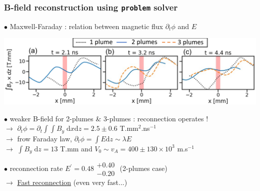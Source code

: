 \documentclass{beamer}
\newcommand{\D}{{\mathrm d}}
\begin{document}
\begin{frame}
\frametitle{B-field reconstruction using \texttt{problem} solver}

$\bullet$ Maxwell-Faraday : relation between magnetic flux $\partial_t \phi$ and $E$ \\

\begin{center}
\includegraphics[width=1.0\textwidth]{problem.png}
\end{center}

$\bullet$ weaker B-field for 2-plumes \& 3-plumes : reconnection operates ! \\
$\to$ $\partial_t \phi = \partial_t \int \!\!\! \int B_y \; \D x \D z = 2.5 \pm 0.6$ T.mm$^2$.ns$^{-1}$ \\
$\to$ frow Faraday law, $\partial_t \phi = \int E \D z \sim \lambda E$ \\
$\to$ $\int B_y \; \D z = 13$ T.mm and $V_0 \sim v_A = 400 \pm 130 \times 10^3$ m.s$^{-1}$ \\

\bigskip

$\bullet$ reconnection rate $E^{\prime} = 0.48 \substack{+0.40 \\ -0.20}$ (2-plumes case) \\
$\to$ \underline{Fast reconnection} (even very fast...) \\

\end{frame}
\end{document}
